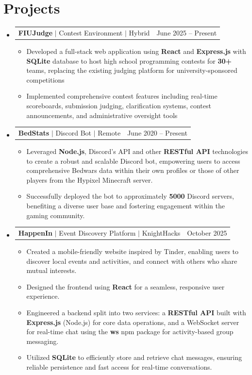 \documentclass[letterpaper,9pt]{article} %
\makeatletter
\newcommand{\resumeItem}[1]{
  \item\small{
    {#1 \vspace{-2pt}}
  }
}
\newcommand{\resumeProjectHeading}[2]{
    \item
    \begin{tabular*}{0.97\textwidth}{l@{\extracolsep{\fill}}r}
      \small#1 & #2 \\
    \end{tabular*}\vspace{-6pt}
}
\newcommand{\resumeSubHeadingListStart}{\begin{itemize}[leftmargin=0.15in, label={}]}
\newcommand{\resumeSubHeadingListEnd}{\end{itemize}}
\newcommand{\resumeItemListStart}{\begin{itemize}}
\newcommand{\resumeItemListEnd}{\end{itemize}\vspace{-4pt}}
\makeatother
\begin{document}
\section{Projects}
    \resumeSubHeadingListStart
		  \resumeProjectHeading
          {\textbf{FIUJudge} $|$ Contest Environment $|$ Hybrid}{June 2025 -- Present}
          \resumeItemListStart
            \resumeItem{Developed a full-stack web application using \textbf{React} and \textbf{Express.js} with \textbf{SQLite} database to host high school programming contests for \textbf{30+} teams, replacing the existing judging platform for university-sponsored competitions}
            \resumeItem{Implemented comprehensive contest features including real-time scoreboards, submission judging, clarification systems, contest announcements, and administrative oversight tools}
          \resumeItemListEnd
    \resumeSubHeadingListEnd

    \resumeSubHeadingListStart
      \resumeProjectHeading
          {\textbf{BedStats} $|$ Discord Bot $|$ Remote}{June 2020 -- Present}
          \resumeItemListStart
            \resumeItem{Leveraged \textbf{Node.js}, Discord’s API and other \textbf{RESTful API} technologies to create a robust and scalable Discord bot, empowering users to access comprehensive Bedwars data within their own profiles or those of other players from the Hypixel Minecraft server.}
            \resumeItem{Successfully deployed the bot to approximately \textbf{5000} Discord servers, benefiting a diverse user base and fostering engagement within the gaming community.}
          \resumeItemListEnd
      
    \resumeSubHeadingListEnd
    \resumeSubHeadingListStart
      \resumeProjectHeading
          {\textbf{HappenIn} $|$ Event Discovery Platform $|$ KnightHacks}{October 2025}
          \resumeItemListStart
            \resumeItem{Created a mobile-friendly website inspired by Tinder, enabling users to discover local events and activities, and connect with others who share mutual interests.}
            \resumeItem{Designed the frontend using \textbf{React} for a seamless, responsive user experience.}
            \resumeItem{Engineered a backend split into two services: a \textbf{RESTful API} built with \textbf{Express.js} (Node.js) for core data operations, and a WebSocket server for real-time chat using the \textbf{ws} npm package for activity-based group messaging.}
            \resumeItem{Utilized \textbf{SQLite} to efficiently store and retrieve chat messages, ensuring reliable persistence and fast access for real-time conversations.}
          \resumeItemListEnd
    \resumeSubHeadingListEnd
    
\end{document}
